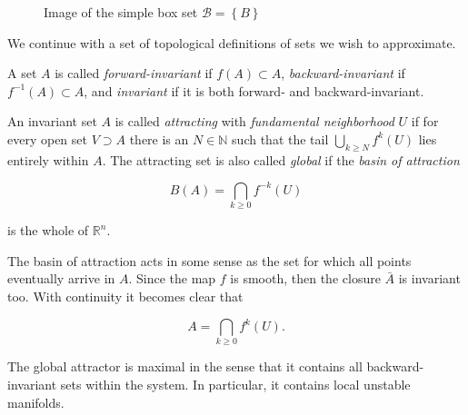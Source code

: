 \begin{figure}[ht]
    \caption{Image of the simple box set $\mathcal{B} = \left\{ B \right\}$}
    \label{fig:boximage}
\end{figure}

We continue with a set of topological definitions of sets we wish to approximate.

\begin{definition}
    \cite*{algGAIO} A set $A$ is called \emph{forward-invariant} if $f(A) \subset A$, 
    \emph{backward-invariant} if $f^{-1}(A) \subset A$, and \emph{invariant} if it is
    both forward- and backward-invariant.
\end{definition}

\begin{definition}
    \cite*{subalg} An invariant set $A$ is called \emph{attracting} with \emph{fundamental neighborhood}
    $U$ if for every open set $V \supset A$ there is an $N \in \mathbb{N}$ such that the tail 
    $\bigcup_{k \geq N} f^k(U)$ lies entirely within $A$. The attracting 
    set is also called \emph{global} if the \emph{basin of attraction} 
    
    \begin{equation}\label{eq:globattr}
        B(A) = \bigcap\limits_{k \geq 0} f^{-k}(U)
    \end{equation}

    is the whole of $\mathbb{R}^n$.
\end{definition}

The basin of attraction acts in some sense as the set for which all points eventually arrive
in $A$. Since the map $f$ is smooth, then the closure $\bar{A}$ is invariant too. With continuity 
it becomes clear that

\begin{equation}
    A = \bigcap\limits_{k \geq 0} f^k(U).
\end{equation}

The global attractor is maximal in the sense that it contains all backward-invariant 
sets within the system. In particular, it contains local unstable manifolds.

